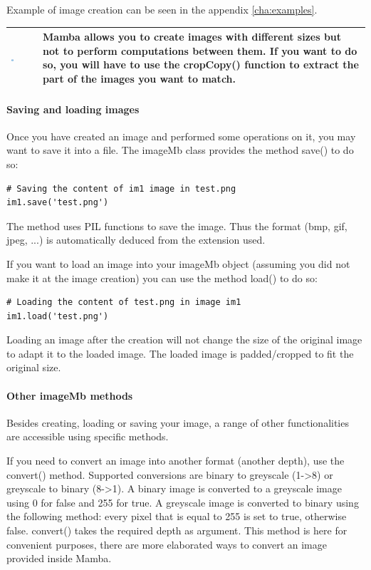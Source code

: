 \documentclass[a4paper,10pt,oneside]{article}
\newenvironment{tipBox}
{
    \begin{center}
    \begin{tabular}{ | b{0.1\textwidth} b{0.8\textwidth} | }
    \hline
    \rowcolor{lightblue}
    \includegraphics[width=0.1\textwidth]{Crystal_Clear_action_info.png} &
}
{
    \\
    \hline
    \end{tabular}
    \end{center}
}
\begin{document}
Example of image creation can be seen in the appendix \ref{cha:examples}.

\begin{tipBox}
Mamba allows you to create images with different sizes but not to perform
computations between them. If you want to do so, you will have to use the
cropCopy() function to extract the part of the images you want to match.
\end{tipBox}

\paragraph{Saving and loading images}

Once you have created an image and performed some operations on it, you may want 
to save it into a file. The imageMb class provides the method save() to do so:

\lstset{language=Python}
\begin{lstlisting}
# Saving the content of im1 image in test.png
im1.save('test.png')
\end{lstlisting}

The method uses PIL functions to save the image. Thus the format (bmp, gif, 
jpeg, ...) is automatically deduced from the extension used.

If you want to load an image into your imageMb object (assuming you did not make
it at the image creation) you can use the method load() to do so:

\lstset{language=Python}
\begin{lstlisting}
# Loading the content of test.png in image im1
im1.load('test.png')
\end{lstlisting}

Loading an image after the creation will not change the size of the original 
image to adapt it to the loaded image. The loaded image is padded/cropped to fit
the original size.

\paragraph{Other imageMb methods}

Besides creating, loading or saving your image, a range of other functionalities
are accessible using specific methods.

If you need to convert an image into another format (another depth), use the 
convert() method. Supported conversions are binary to greyscale (1->8) or 
greyscale to binary (8->1). A binary image is converted to a greyscale image using
0 for false and 255 for true. A greyscale image is converted to binary using the
following method: every pixel that is equal to 255 is set to true, otherwise 
false. convert() takes the required depth as argument. This method is here for 
convenient purposes, there are more elaborated ways to convert an image provided
inside Mamba.
\end{document}
